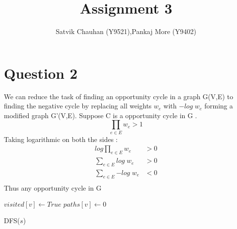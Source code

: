 \documentclass[11pt]{article}
\title{Assignment 3}
\author{Satvik Chauhan (Y9521),Pankaj More (Y9402)}
\begin{document}
\maketitle
\section*{Question 2}
We can reduce the task of finding an opportunity cycle in a graph G(V,E) to finding the negative cycle by replacing all weights $w_e$ with $-log \; w_e$
forming a modified graph G'(V,E). Suppose C is a opportunity cycle in G . 
\[ \prod_{e \in E} {w_e} > 1 \]
Taking logarithmic on both the sides :
\begin{align*}
log \prod_{e \in E} {w_e} &> 0 \\
\sum_{e \in E} {log \; w_e} &> 0 \\
\sum_{e \in E} {-log \; w_e} &< 0 \\
\end{align*}
Thus any opportunity cycle in G 



\begin{algorithm}
$visited[v] \leftarrow True$ \;
$paths[v] \leftarrow 0 $ \;
\caption{\textsc{DFS(\(s\)) }}
\label{UID}
\end{algorithm}
\end{document}
